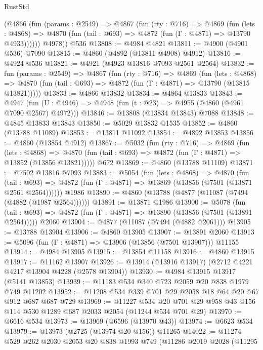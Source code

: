 \begin{lexlean}{RustStd}
\begin{coremodule}
        (@4866
          (fun (params : @2549) =>
          @4867
            (fun (rty : @716) =>
            @4869
              (fun (lets : @4868) =>
              @4870 (fun (tail : @693) => @4872 (fun (Γ : @4871) => @13790 @4933))))))
        @4978))
    @536
@13808 := @4984 @4821
@13811 := @4900 (@4901 @536) @7090
@13815 := @4860 (@4892 (@13811 @4908) @4912)
@13816 := @4924 @536
@13821 := @4921 (@4923 @13816 @7093 @2561 @2564)
@13832 := fun (params : @2549) =>
  @4867
    (fun (rty : @716) =>
    @4869
      (fun (lets : @4868) =>
      @4870 (fun (tail : @693) => @4872 (fun (Γ : @4871) => @13790 (@13815 @13821)))))
@13833 := @4866 @13832
@13834 := @4864 @13833
@13843 := @4947
    (fun (U : @4946) => @4948 (fun (t : @23) => @4955 (@4860 (@4961 @7090 @2567) @4972)))
@13846 := @13808 (@13834 @13843) @7088
@13848 := @4845 @13833 @13843
@13850 := @5029 @13832 @1535
@13852 := @4860 (@13788 @11089)
@13853 := @13811 @11092
@13854 := @4892 @13853
@13856 := @4860 (@13854 @4912)
@13867 := @5032
    (fun (rty : @716) =>
    @4869
      (fun (lets : @4868) =>
      @4870 (fun (tail : @693) => @4872 (fun (Γ : @4871) => @13852 (@13856 @13821)))))
    @672
@13869 := @4860 (@13788 @11109)
@13871 := @7502 @13816 @7093
@13883 := @5054
    (fun (lets : @4868) =>
    @4870
      (fun (tail : @693) =>
      @4872 (fun (Γ : @4871) => @13869 (@13856 (@7501 (@13871 @2561 @2564))))))
    @1986
@13890 := @4860 (@13788 (@4877 (@11087 (@7494 (@4882 (@1987 @2564))))))
@13891 := @13871 @1986
@13900 := @5078
    (fun (tail : @693) => @4872 (fun (Γ : @4871) => @13890 (@13856 (@7501 (@13891 @2564)))))
    @2060
@13904 := @4877 (@11087 (@7494 (@4882 @2061)))
@13905 := @13788 @13904
@13906 := @4860 @13905
@13907 := @13891 @2060
@13913 := @5096 (fun (Γ : @4871) => @13906 (@13856 (@7501 @13907))) @11155
@13914 := @4984 @13905
@13915 := @13854 @11158
@13916 := @4860 @13915
@13917 := @11162 @13907
@13926 := @13914 (@13916 @13917) (@2712 @4221 @4217 @13904 @4228 (@2578 @13904))
@13930 := @4984 @13915 @13917 (@5141 @13853)
@13939 := @11183 @534 @340 @723 @2059 @20 @838 @1979 @749 @11202
@13952 := @11208 @534 @339 @701 @29 @2058 @18 @64 @20 @67 @912 @687 @687 @729
@13969 := @11227
    @534
    @20
    @701
    @29
    @958
    @43
    @156
    @114
    @530
    @1289
    @687
    @2033
    @2054
    (@11244 @534 @701 @29)
@13970 := @6616 @534
@13973 := @13969 (@6596 (@13970 @43))
@13974 := @6623 @534
@13979 := @13973 (@2725 (@13974 @20 @156)) @11265
@14022 := @11274
    @529
    @262
    @2030
    @2053
    @20
    @838
    @1993
    @749
    (@11286
      @2019
      @2028
      (@11295

\end{coremodule}
\end{lexlean}
